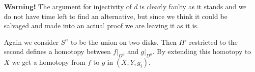 \documentclass[a4paper,11pt,english]{article}
\begin{document}
\begin{exercise}[1]
\textbf{Warning!}
The argument for injectivity of $d$ is clearly faulty as it stands and we do not have time left to find an alternative, but since we think it could be salvaged and made into an actual proof we are leaving it as it is.

Again we consider $S^n$ to be the union on two disks. Then $H'$ restricted to the second defines a homotopy between $f|_{D^n}$ and $g|_{D^n}$. By extending this homotopy to $X$ we get a homotopy from $f$ to $g$ in $(X,Y,g_i)$.


\end{exercise} 
\end{document}
